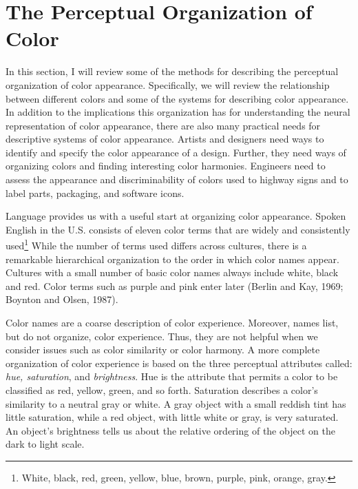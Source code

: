 \section{The Perceptual Organization of Color}
In this section, I will review some of the methods for describing the
perceptual organization of color appearance.  Specifically, we will
review the relationship between different colors and some of the
systems for describing color appearance.  In addition to the
implications this organization has for understanding the neural
representation of color appearance, there are also many practical
needs for descriptive systems of color appearance.  Artists and
designers need ways to identify and specify the color appearance of a
design.  Further, they need ways of organizing colors and finding
interesting color harmonies.  Engineers need to assess the appearance
and discriminability of colors used to highway signs and to label
parts, packaging, and software icons.

Language provides us with a useful start at organizing color
appearance.  Spoken English in the U.S. consists of eleven color terms
that are widely and consistently used\footnote{White, black, red,
green, yellow, blue, brown, purple, pink, orange, gray.}  While the
number of terms used differs across cultures, there is a remarkable
hierarchical organization to the order in which color names appear.
Cultures with a small number of basic color names always include
white, black and red.  Color terms such as purple and pink enter later
(Berlin and Kay, 1969; Boynton and Olsen, 1987).

Color names are a coarse description of color experience.  Moreover,
names list, but do not organize, color experience.  Thus, they are not
helpful when we consider issues such as color similarity or color
harmony.  A more complete organization of color experience is based
on the three perceptual attributes called: {\em hue, saturation}, and
{\em brightness}.  Hue is the attribute that permits a color to be
classified as red, yellow, green, and so forth.  Saturation describes
a color's similarity to a neutral gray or white.  A gray object with a
small reddish tint has little saturation, while a red object, with
little white or gray, is very saturated.  An object's brightness tells
us about the relative ordering of the object on the dark to light
scale.

